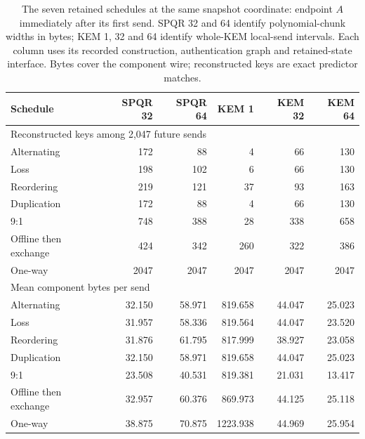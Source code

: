 \begin{table}[t]
\centering
\small
\setlength{\tabcolsep}{4pt}
\begin{tabular}{@{}lrrrrr@{}}
\toprule
Schedule & SPQR 32 & SPQR 64 & KEM 1 & KEM 32 & KEM 64\\
\midrule
\multicolumn{6}{l}{Reconstructed keys among 2,047 future sends}\\
Alternating & 172 & 88 & 4 & 66 & 130\\
Loss & 198 & 102 & 6 & 66 & 130\\
Reordering & 219 & 121 & 37 & 93 & 163\\
Duplication & 172 & 88 & 4 & 66 & 130\\
9:1 & 748 & 388 & 28 & 338 & 658\\
Offline then exchange & 424 & 342 & 260 & 322 & 386\\
One-way & 2047 & 2047 & 2047 & 2047 & 2047\\
\midrule
\multicolumn{6}{l}{Mean component bytes per send}\\
Alternating & 32.150 & 58.971 & 819.658 & 44.047 & 25.023\\
Loss & 31.957 & 58.336 & 819.564 & 44.047 & 23.520\\
Reordering & 31.876 & 61.795 & 817.999 & 38.927 & 23.058\\
Duplication & 32.150 & 58.971 & 819.658 & 44.047 & 25.023\\
9:1 & 23.508 & 40.531 & 819.381 & 21.031 & 13.417\\
Offline then exchange & 32.957 & 60.376 & 869.973 & 44.125 & 25.118\\
One-way & 38.875 & 70.875 & 1223.938 & 44.969 & 25.954\\
\bottomrule
\end{tabular}
\caption{The seven retained schedules at the same snapshot coordinate: endpoint $A$ immediately after its first send. SPQR 32 and 64 identify polynomial-chunk widths in bytes; KEM 1, 32 and 64 identify whole-KEM local-send intervals. Each column uses its recorded construction, authentication graph and retained-state interface. Bytes cover the component wire; reconstructed keys are exact predictor matches.}
\label{tab:reference-schedules}
\end{table}

